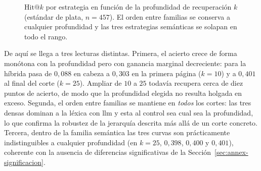 \begin{figure}[htbp]
  \centering
  \caption[Sensibilidad del acierto a la profundidad de recuperación]{$\mathrm{Hit@}k$ por estrategia en función de la profundidad de recuperación $k$ (estándar de plata, $n=457$). El orden entre familias se conserva a cualquier profundidad y las tres estrategias semánticas se solapan en todo el rango.}
  \label{fig:hitk-curva}
\end{figure}

De aquí se llega a tres lecturas distintas.
Primera, el acierto crece de forma monótona con la profundidad pero con ganancia marginal decreciente: para la híbrida pasa de $0{,}088$ en cabeza a $0{,}303$ en la primera página ($k=10$) y a $0{,}401$ al final del corte ($k=25$).
Ampliar de $10$ a $25$ todavía recupera cerca de diez puntos de acierto, de modo que la profundidad elegida no resulta holgada en exceso.
Segunda, el orden entre familias se mantiene en \emph{todos} los cortes: las tres densas dominan a la léxica con \gls{llm} y esta al control sea cual sea la profundidad, lo que confirma la robustez de la jerarquía descrita más allá de un corte concreto.
Tercera, dentro de la familia semántica las tres curvas son prácticamente indistinguibles a cualquier profundidad (en $k=25$, $0{,}398$, $0{,}400$ y $0{,}401$), coherente con la ausencia de diferencias significativas de la Sección~\ref{sec:annex-significacion}.


